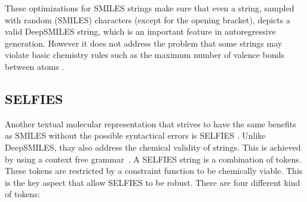 These optimizations for SMILES strings make sure that even a string,
sampled with random (SMILES) characters (except for the opening bracket),
depicts a valid DeepSMILES string,
which is an important feature in autoregressive generation. However it does not address the problem that some strings may violate basic chemistry rules such as the maximum number of valence bonds between atoms \cite{krenn2020self}.

\subsection{SELFIES}

Another textual molecular representation that strives to have the same benefits as SMILES without the possible syntactical errors is \ac{SELFIES} \cite{krenn2020self}.
Unlike DeepSMILES, thay also address the chemical validity of strings. This is achieved by using a context free grammar~\cite{lo2023recent}. A SELFIES string is a combination of tokens. These tokens are restricted by a constraint function to be chemically viable.
This is the key aspect that allow SELFIES to be robust. There are four different kind of tokens:

